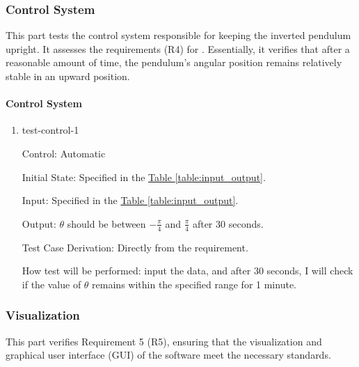 \documentclass[12pt, titlepage]{article}
\begin{document}
\subsubsection{Control System}

This part tests the control system responsible for keeping 
the inverted pendulum upright. It assesses the requirements 
(R4) for \progname{}. Essentially, it verifies that after a 
reasonable amount of time, the pendulum's angular position 
remains relatively stable in an upward position.

		
\paragraph{Control System}

\begin{enumerate}

\item{test-control-1\\}

Control: Automatic
					
Initial State: Specified in the \hyperref[table:input_output]{Table \ref*{table:input_output}}.
					
Input: Specified in the \hyperref[table:input_output]{Table \ref*{table:input_output}}.
					
Output: $\theta$ should be between $-\frac{\pi}{4}$ and $\frac{\pi}{4}$ after 30 seconds.

Test Case Derivation: Directly from the requirement.
					
How test will be performed: 
input the data, and after 30 seconds, I will check if the 
value of $\theta$ remains within the specified range for 1 minute.

\end{enumerate}

\subsubsection{Visualization} \label{func_test_visualization}

This part verifies Requirement 5 (R5), ensuring that the visualization 
and graphical user interface (GUI) of the software meet the necessary standards.
\end{document}
